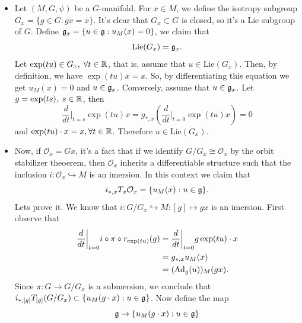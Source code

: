 \begin{itemize}
\begin{equation}
        \end{equation}
        \item Let $(M,G,\psi)$ be a $G$-manifold. For $x\in M$, we define the isotropy subgroup 
        $G_x=\{g\in G:gx=x\}$. It's clear that $G_x\subset G$ is closed, so it's a Lie subgroup of $G$. Define 
        $\mathfrak{g}_x=\{u\in\mathfrak{g}:u_M(x)=0\}$, we claim that  
        \begin{equation}
            \text{Lie}(G_x)=\mathfrak{g}_x.
        \end{equation}
        Let $\exp(tu)\in G_x,\;\forall t\in\mathbb{R}$, that is, assume that $u\in\text{Lie}(G_x)$. Then, by definition, we have 
        $\exp(tu)x=x$. So, by differentiating this equation we get $u_M(x)=0$ and $u\in\mathfrak{g}_x$. Conversely, assume that 
        $u\in\mathfrak{g}_x$. Let $g=\exp(ts),\;s\in\mathbb{R}$, then 
        \begin{equation}
            \frac{d}{dt}\bigg|_{t=s}\exp(tu)x= g_{*,x}(\frac{d}{dt}\bigg|_{t=0}\exp(tu)x)=0
        \end{equation}
        and $\exp(tu)\cdot x = x,\forall t\in\mathbb{R}$. Therefore $u\in\text{Lie}(G_x)$.
        \item Now, if $\mathcal{O}_x=Gx$, it's a fact that if we identify $G/G_x\cong \mathcal{O}_x$ by the 
        orbit stabilizer theoerem, then $\mathcal{O}_x$ inherits a differentiable structure such that the inclusion 
        $i:\mathcal{O}_x\hookrightarrow M$ is an imersion. In this context we claim that 
        \begin{equation}
            i_{*,x}T_x\mathcal{O}_x=\{u_M(x): u\in\mathfrak{g}\}.
        \end{equation}
        Lets prove it. We know that $i:G/G_x\hookrightarrow M:[g]\mapsto gx$ is an imersion. First observe that 
        \begin{equation}
            \begin{split}
                \frac{d}{dt}\bigg|_{t=0}i\circ\pi\circ r_{\exp(tu)}(g)&=\frac{d}{dt}\bigg|_{t=0}g\exp(tu)\cdot x\\
                &=g_{*,x}u_M(x)\\
                &=(\text{Ad}_g(u))_M(gx).
            \end{split}
        \end{equation}
        Since $\pi:G\rightarrow G/G_x$ is a submersion, we conclude that 
        $i_{*,[g]}T_{[g]}(G/G_x)\subset \{u_M(g\cdot x):u\in\mathfrak{g}\}$. Now define the map 
        \begin{equation}
            \fr{g}\to \{u_M(g\cdot x):u\in\fr{g}\}

\end{equation}
\end{itemize}
